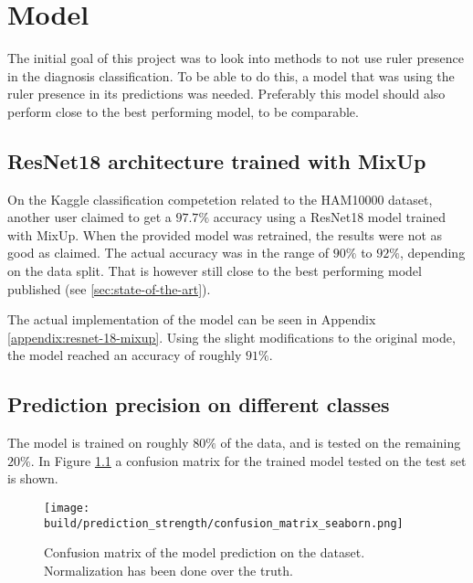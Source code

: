 \chapter{Model}\label{sec:model}
The initial goal of this project was to look into methods to not use ruler presence in the
diagnosis classification.
To be able to do this, a model that was using the ruler presence in its predictions was needed.
Preferably this model should also perform close to the best performing model, to be comparable.

\section{ResNet18 architecture trained with MixUp}
On the Kaggle classification competetion related to the HAM10000 dataset\cite{HAM10000-kaggle-competetion},
another user claimed to get a $97.7\%$ accuracy using a ResNet18 model trained with MixUp\cite{kaggle-97-model}.
When the provided model was retrained, the results were not as good as claimed.
The actual accuracy was in the range of $90\%$ to $92\%$, depending on the data split.
That is however still close to the best performing model published (see \ref{sec:state-of-the-art}).

The actual implementation of the model can be seen in Appendix \ref{appendix:resnet-18-mixup}.
Using the slight modifications to the original mode, the model reached an accuracy of roughly $91\%$.

\section{Prediction precision on different classes}
The model is trained on roughly $80\%$ of the data, and is tested on the remaining $20\%$.
In Figure \ref{fig:prediction_strength} a confusion matrix for the trained model tested on the test set is shown.

\begin{figure}[ht]
    \centering
    \texttt{[image: build/prediction\_strength/confusion\_matrix\_seaborn.png]}
    \caption{Confusion matrix of the model prediction on the dataset. 
        Normalization has been done over the truth.
    }
    \label{fig:prediction_strength}
\end{figure}